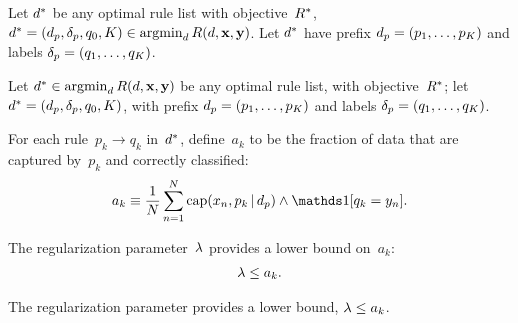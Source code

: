 \begin{theorem}
\label{thm:min-capture-correct}
\begin{arxiv}
Let ${d^*}$
be any optimal rule list with objective~$R^*$, \ie
${d^* = (d_p, \delta_p, q_0, K) \in \operatorname*{argmin}_{d} R({d}, \mathbf{x}, \mathbf{y})}$.
%
Let $d^*$ have prefix ${d_p = (p_1, \dots, p_K)}$
and labels ${\delta_p = (q_1, \dots, q_K)}$.
\end{arxiv}
\begin{kdd}
Let ${d^* \in \operatorname*{argmin}_{d} R({d}, \mathbf{x}, \mathbf{y})}$
be any optimal rule list, with objective~$R^*$;
let ${d^* = (d_p, \delta_p, q_0, K)}$,
with prefix ${d_p = (p_1, \dots, p_K)}$
and labels ${\delta_p = (q_1, \dots, q_K)}$.
\end{kdd}
%
For each rule~${p_k \rightarrow q_k}$ in~$d^*$,
define~$a_k$ to be the fraction of data that are captured by~$p_k$
and correctly classified:
\begin{align}
a_k \equiv \frac{1}{N} \sum_{n=1}^N
  \Cap(x_n, p_k \given \Prefix) \wedge \one [ q_k = y_n ].
\label{eq:rule-correct}
\end{align}
\begin{arxiv}
The regularization parameter~${\lambda}$ provides a lower bound on~$a_k$:
\begin{align}
{\lambda} \le a_k.
\label{eq:min-capture-correct}
\end{align}
\end{arxiv}
\begin{kdd}
The regularization parameter provides a lower bound, ${\lambda} \le a_k$.
\end{kdd}
\end{theorem}

